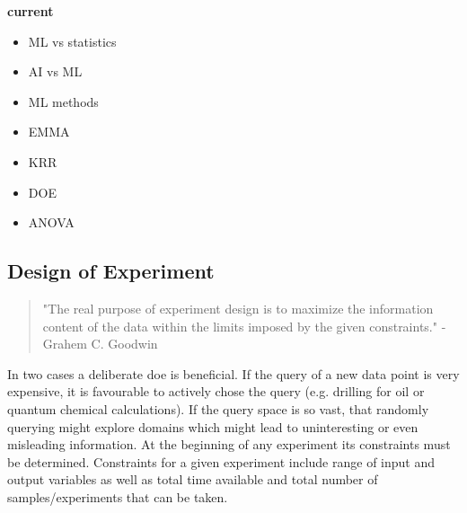 \textbf{current}
\begin{itemize}
    \item ML vs statistics
    \item AI vs ML 
    \item ML methods
    \item EMMA 
    \item KRR 
    \item DOE
    \item ANOVA
\end{itemize}
\fi



\subsection{Design of Experiment} %
%
\begin{quote}
	{"The real purpose of experiment design is to maximize the information content of the data within the limits imposed by the given constraints."}
	- {Grahem C. Goodwin\cite{goodwin1977experiment}}
\end{quote}
%
In two cases a deliberate \gls{doe} is beneficial.
If the query of a new data point is very expensive, it is favourable to actively chose the query (e.g. drilling for oil or quantum chemical calculations). 
If the query space is so vast, that randomly querying might explore domains which might lead to uninteresting or even misleading information.
% 
At the beginning of any experiment its constraints must be determined. 
%
Constraints for a given experiment include range of input and output variables as well as total time available and total number of samples/experiments that can be taken.\cite{goodwin1977experiment}
%

